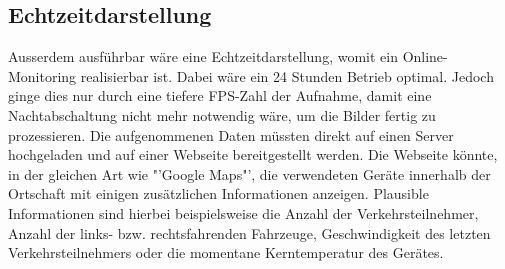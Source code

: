 \subsection{Echtzeitdarstellung}
Ausserdem ausführbar wäre eine Echtzeitdarstellung, womit ein Online-Monitoring realisierbar ist. Dabei wäre ein 24 Stunden Betrieb optimal. Jedoch ginge dies nur durch eine tiefere FPS-Zahl der Aufnahme, damit eine Nachtabschaltung nicht mehr notwendig wäre, um die Bilder fertig zu prozessieren. Die aufgenommenen Daten müssten direkt auf einen Server hochgeladen und auf einer Webseite bereitgestellt werden. Die Webseite könnte, in der gleichen Art wie "'Google Maps"', die verwendeten Geräte innerhalb der Ortschaft mit einigen zusätzlichen Informationen anzeigen. Plausible Informationen sind hierbei beispielsweise die Anzahl der Verkehrsteilnehmer, Anzahl der links- bzw. rechtsfahrenden Fahrzeuge, Geschwindigkeit des letzten Verkehrsteilnehmers oder die momentane Kerntemperatur des Gerätes. 
